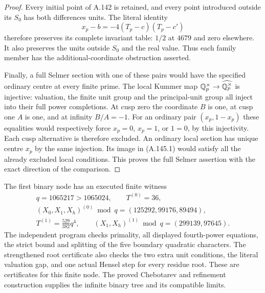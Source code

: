 \begin{proof}
Every initial point of A.142 is retained, and every point
introduced outside its \(S_0\) has both differences units.
The literal identity
\[
                x_p-b=-4(T_p-c)(T_p-c')
\tag{A.145.20}
\]
therefore preserves its complete invariant table: \(1/2\)
at \(4679\) and zero elsewhere.  It also preserves the
units outside \(S_0\) and the real value.  Thus each family
member has the additional-coordinate obstruction asserted.

Finally, a full Selmer section with one of these pairs would
have the specified ordinary centre at every finite prime.
The local Kummer map \(\mathbb Q_p^\times\to
\widehat{\mathbb Q_p^\times}\) is injective: valuation, the finite
unit group and the principal-unit group all inject into their
full power completions.  At cusp zero the coordinate \(B\)
is one, at cusp one \(A\) is one, and at infinity \(B/A=-1\).
For an ordinary pair \((x_p,1-x_p)\) these equalities would
respectively force \(x_p=0\), \(x_p=1\), or \(1=0\), by
this injectivity.  Each cusp alternative is therefore excluded.
An ordinary local section has unique centre \(x_p\) by the
same injection.  Its image in (A.145.1) would satisfy all the
already excluded local conditions.  This proves the full
Selmer assertion with the exact direction of the comparison.
\end{proof}

The first binary node has an executed finite witness
\[
 \begin{gathered}
 q=1065217>1065024,\qquad T^{(0)}=36,\\
 (X_0,X_1,X_h)^{(0)}\bmod q=(125292,99176,89494),\\
 T^{(1)}=\tfrac{529}{382}q^4,
       \qquad (X_1,X_h)^{(1)}\bmod q=(299139,97645).
 \end{gathered}
\tag{A.145.21}
\]
The independent program
checks primality, all displayed fourth-power equations, the
strict bound and splitting of the five boundary quadratic
characters.  The strengthened root certificate also checks
the two extra unit conditions, the literal valuation gap,
and one actual Hensel step for every residue root.
These are certificates for this finite node.  The proved
Chebotarev and refinement construction supplies the infinite
binary tree and its compatible limits.

